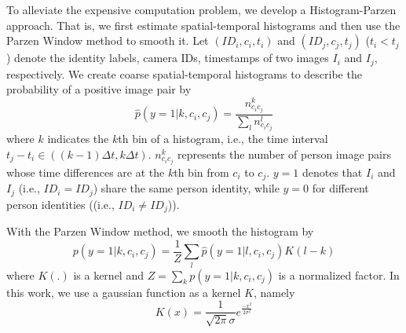 \documentclass[letterpaper]{article} %
\begin{document}
To alleviate the expensive computation problem, we develop a Histogram-Parzen approach. That is, we first estimate spatial-temporal histograms and then use the Parzen Window method to smooth it. Let $({ID}_i,c_i,t_i)$ and $({ID}_j,c_j,t_j)$ ($t_i<t_j$) denote the identity labels, camera IDs, timestamps of two images $I_i$ and $I_j$, respectively. We create coarse spatial-temporal histograms to describe the probability of a positive image pair by
\begin{equation}
    \label{eq:hist}
    {\hat p}(y=1|k,c_i,c_j) = \frac{{n_{c_ic_j}^k}}{{\sum\limits_l {n_{c_ic_j}^l} }}
\end{equation}
where $k$ indicates the $k$th bin of a histogram, i.e., the time interval $t_j-t_i\in((k-1)\Delta t,k\Delta t)$. $n_{c_{i}c_{j}}^k$ represents the number of person image pairs whose time differences are at the $k$th bin from $c_i$ to $c_j$. $y=1$ denotes that $I_i$ and $I_j$ (i.e., ${ID}_i={ID}_j$) share the same person identity, while $y=0$ for different person identities ((i.e., ${ID}_i\neq{ID}_j$)).

With the Parzen Window method, we smooth the histogram by
\begin{equation}
    \label{eq:parzen}
    p(y=1|k,c_i,c_j) = \frac{1}{Z}\sum\limits_l {{\hat p}(y=1|l,c_i,c_j)K(l - k)}
\end{equation}
where $K(.)$ is a kernel and $Z = \sum\limits_k {p(y=1|k,c_i,c_j)}$ is a normalized factor. In this work, we use a gaussian function as a kernel $K$, namely
\begin{equation}
    \label{eq:gaussian}
    K(x) = \frac{1}{{\sqrt {2\pi}\sigma }}{e^{\frac{{{-x^2}}}{{2{\sigma ^2}}}}}
\end{equation}
\end{document}
